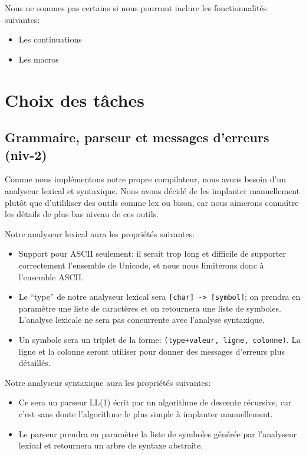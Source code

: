 \documentclass[11pt]{article}
\begin{document}
Nous ne sommes pas certains si nous pourront inclure les
fonctionnalités suivantes:

\begin{itemize}
\item Les continuations
\item Les macros
\end{itemize}





\section{Choix des tâches}

\subsection{Grammaire, parseur et messages d'erreurs (niv-2)}

Comme nous implémentons notre propre compilateur, nous avons besoin
d'un analyseur lexical et syntaxique.  Nous avons décidé de les
implanter manuellement plutôt que d'utililiser des outils comme lex ou
bison, car nous aimerons connaître les détails de plus bas niveau de
ces outils.

Notre analyseur lexical aura les propriétés suivantes:


\begin{itemize}
\item Support pour ASCII seulement: il serait trop long et difficile
  de supporter correctement l'ensemble de Unicode, et nous nous
  limiterons donc à l'ensemble ASCII.
\item Le ``type'' de notre analyseur lexical sera \texttt{[char] ->
    [symbol]}; on prendra en paramètre une liste de caractères et on
  retournera une liste de symboles.  L'analyse lexicale ne sera pas
  concurrente avec l'analyse syntaxique.
\item Un symbole sera un triplet de la forme: \texttt{(type+valeur,
    ligne, colonne)}.  La ligne et la colonne seront utiliser pour
  donner des messages d'erreurs plus détaillés.
\end{itemize}

Notre analyseur syntaxique aura les propriétés suivantes:

\begin{itemize}
\item Ce sera un parseur LL(1) écrit par un algorithme de descente
  récursive, car c'est sans doute l'algorithme le plus simple à
  implanter manuellement.
\item Le parseur prendra en paramètre la liste de symboles générée par
  l'analyseur lexical et retournera un arbre de syntaxe abstraite.
\end{itemize}
\end{document}
